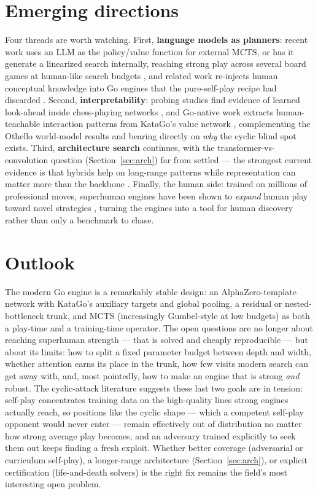 \documentclass[11pt]{article}
\begin{document}
\section{Emerging directions}
\label{sec:emerging}
Four threads are worth watching. First, \textbf{language models as planners}: recent work
uses an LLM as the policy/value function for external MCTS, or has it generate a linearized
search internally, reaching strong play across several board games at human-like search
budgets \cite{llmplanning2025}, and related work re-injects human conceptual knowledge into
Go engines that the pure-self-play recipe had discarded \cite{mixexpert2026}. Second,
\textbf{interpretability}: probing studies find evidence of learned look-ahead inside
chess-playing networks \cite{interpchess2024}, and Go-native work extracts human-teachable
interaction patterns from KataGo's value network \cite{interpgo2023}, complementing the
Othello world-model results and bearing directly on \emph{why} the cyclic blind spot exists.
Third, \textbf{architecture search} continues, with the transformer-vs-convolution question
(Section~\ref{sec:arch}) far from settled --- the strongest current evidence is that hybrids
help on long-range patterns \cite{restnet2025} while representation can matter more than the
backbone \cite{alphavile2024}. Finally, the human side: trained on millions of professional
moves, superhuman engines have been shown to \emph{expand} human play toward novel strategies
\cite{novelty2023}, turning the engines into a tool for human discovery rather than only a
benchmark to chase.

\section{Outlook}
The modern Go engine is a remarkably stable design: an AlphaZero-template network with
KataGo's auxiliary targets and global pooling, a residual or nested-bottleneck trunk, and
MCTS (increasingly Gumbel-style at low budgets) as both a play-time and a training-time
operator. The open questions are no longer about reaching superhuman strength --- that is
solved and cheaply reproducible --- but about its limits: how to split a fixed parameter
budget between depth and width, whether attention earns its place in the trunk, how few
visits modern search can get away with, and, most pointedly, how to make an engine that is
strong \emph{and} robust. The cyclic-attack literature suggests these last two goals are in
tension: self-play concentrates training data on the high-quality lines strong engines
actually reach, so positions like the cyclic shape --- which a competent self-play opponent
would never enter --- remain effectively out of distribution no matter how strong average
play becomes, and an adversary trained explicitly to seek them out keeps finding a fresh
exploit.
Whether better coverage (adversarial or curriculum self-play), a longer-range architecture
(Section~\ref{sec:arch}), or explicit certification (life-and-death solvers) is the right
fix remains the field's most interesting open problem.
\end{document}

